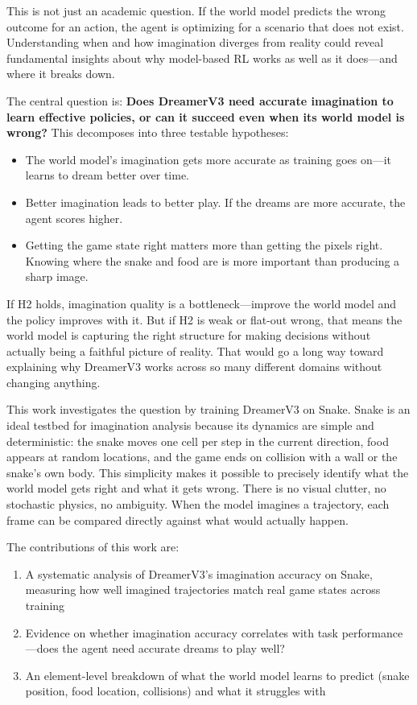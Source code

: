 \documentclass[letterpaper]{article}
\begin{document}
This is not just an academic question. If the world model predicts the wrong outcome for an action, the agent is optimizing for a scenario that does not exist. Understanding when and how imagination diverges from reality could reveal fundamental insights about why model-based RL works as well as it does---and where it breaks down.

The central question is: \textbf{Does DreamerV3 need accurate imagination to learn effective policies, or can it succeed even when its world model is wrong?} This decomposes into three testable hypotheses:
\begin{itemize}
    \item[\textbf{H1:}] The world model's imagination gets more accurate as training goes on---it learns to dream better over time.
    \item[\textbf{H2:}] Better imagination leads to better play. If the dreams are more accurate, the agent scores higher.
    \item[\textbf{H3:}] Getting the game state right matters more than getting the pixels right. Knowing where the snake and food are is more important than producing a sharp image.
\end{itemize}
If H2 holds, imagination quality is a bottleneck---improve the world model and the policy improves with it. But if H2 is weak or flat-out wrong, that means the world model is capturing the right structure for making decisions without actually being a faithful picture of reality. That would go a long way toward explaining why DreamerV3 works across so many different domains without changing anything.

This work investigates the question by training DreamerV3 on Snake. Snake is an ideal testbed for imagination analysis because its dynamics are simple and deterministic: the snake moves one cell per step in the current direction, food appears at random locations, and the game ends on collision with a wall or the snake's own body. This simplicity makes it possible to precisely identify what the world model gets right and what it gets wrong. There is no visual clutter, no stochastic physics, no ambiguity. When the model imagines a trajectory, each frame can be compared directly against what would actually happen.

The contributions of this work are:
\begin{enumerate}
    \item A systematic analysis of DreamerV3's imagination accuracy on Snake, measuring how well imagined trajectories match real game states across training
    \item Evidence on whether imagination accuracy correlates with task performance---does the agent need accurate dreams to play well?
    \item An element-level breakdown of what the world model learns to predict (snake position, food location, collisions) and what it struggles with
\end{enumerate}
\end{document}
